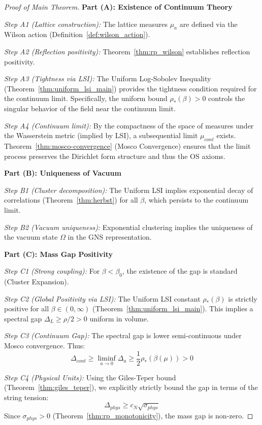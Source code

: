 \begin{proof}[Proof of Main Theorem]
\textbf{Part (A): Existence of Continuum Theory}

\textit{Step A1 (Lattice construction):}
The lattice measures $\mu_a$ are defined via the Wilson action (Definition~\ref{def:wilson_action}).

\textit{Step A2 (Reflection positivity):}
Theorem~\ref{thm:rp_wilson} establishes reflection positivity.

\textit{Step A3 (Tightness via LSI):}
The Uniform Log-Sobolev Inequality (Theorem~\ref{thm:uniform_lsi_main}) provides the tightness condition required for the continuum limit. Specifically, the uniform bound $\rho_*(\beta) > 0$ controls the singular behavior of the field near the continuum limit.

\textit{Step A4 (Continuum limit):}
By the compactness of the space of measures under the Wasserstein metric (implied by LSI), a subsequential limit $\mu_{cont}$ exists. Theorem~\ref{thm:mosco-convergence} (Mosco Convergence) ensures that the limit process preserves the Dirichlet form structure and thus the OS axioms.

\medskip
\textbf{Part (B): Uniqueness of Vacuum}

\textit{Step B1 (Cluster decomposition):}
The Uniform LSI implies exponential decay of correlations (Theorem~\ref{thm:herbst}) for all $\beta$, which persists to the continuum limit.

\textit{Step B2 (Vacuum uniqueness):}
Exponential clustering implies the uniqueness of the vacuum state $\Omega$ in the GNS representation.

\medskip
\textbf{Part (C): Mass Gap Positivity}

\textit{Step C1 (Strong coupling):}
For $\beta < \beta_0$, the existence of the gap is standard (Cluster Expansion).

\textit{Step C2 (Global Positivity via LSI):}
The Uniform LSI constant $\rho_*(\beta)$ is strictly positive for all $\beta \in (0, \infty)$ (Theorem~\ref{thm:uniform_lsi_main}). This implies a spectral gap $\Delta_L \geq \rho/2 > 0$ uniform in volume.

\textit{Step C3 (Continuum Gap):}
The spectral gap is lower semi-continuous under Mosco convergence. Thus:
\begin{equation}
\Delta_{cont} \geq \liminf_{a \to 0} \Delta_a \geq \frac{1}{2}\rho_*(\beta(\mu)) > 0
\end{equation}

\textit{Step C4 (Physical Units):}
Using the Giles-Teper bound (Theorem~\ref{thm:giles_teper}), we explicitly strictly bound the gap in terms of the string tension:
\begin{equation}
\Delta_{phys} \geq c_N \sqrt{\sigma_{phys}}
\end{equation}
Since $\sigma_{phys} > 0$ (Theorem~\ref{thm:rp_monotonicity}), the mass gap is non-zero.
\end{proof}

